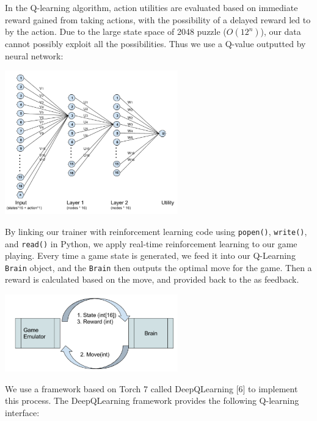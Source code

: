 \documentclass[9pt,twocolumn]{article}
\begin{document}
In the Q-learning algorithm, action utilities are evaluated based on immediate reward gained from taking actions, with the possibility of a delayed reward led to by the action. Due to the large state space of 2048 puzzle ($O(12^n)$), our data cannot possibly exploit all the possibilities. Thus we use a Q-value outputted by neural network:

\begin{centering}

\includegraphics[width=75mm]{rl_nodes.png}

\end{centering}

By linking our trainer with reinforcement learning code using \texttt{popen()}, \texttt{write()}, and \texttt{read()} in Python, we apply real-time reinforcement learning to our game playing. Every time a game state is generated, we feed it into our Q-Learning \texttt{Brain} object, and the \texttt{Brain} then outputs the optimal move for the game. Then a reward is calculated based on the move, and provided back to the  as feedback.

\begin{centering}

\includegraphics[width=75mm]{rl_state.png}

\end{centering}

We use a framework based on Torch 7 called DeepQLearning [6] to implement this process. The DeepQLearning framework provides the following Q-learning interface:
\end{document}
